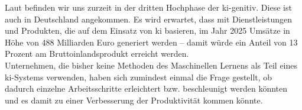 \documentclass[twoside, 12pt,a4paper]{book}
\numberwithin{equation}{section}
\begin{document}

	
	Laut \cite{deeplearning_weather} befinden wir uns zurzeit in der dritten Hochphase der \ac*{ki-genitiv}. Diese ist auch in Deutschland angekommen.	Es wird erwartet, dass mit Dienstleistungen und Produkten, die auf dem	Einsatz von \ac{ki} basieren, im Jahr 2025 Umsätze in Höhe von 488 Milliarden Euro generiert werden – damit würde ein Anteil von 13 Prozent am Bruttoinlandsprodukt erreicht werden. \\
	
	\noindent Unternehmen, die bisher keine Methoden des Maschinellen Lernens als Teil eines \ac{ki}-Systems verwenden, haben sich zumindest einmal die Frage gestellt, ob dadurch einzelne Arbeitsschritte erleichtert bzw. beschleunigt werden könnten und es damit zu einer Verbesserung der Produktivität kommen könnte. \\
	
\end{document}

